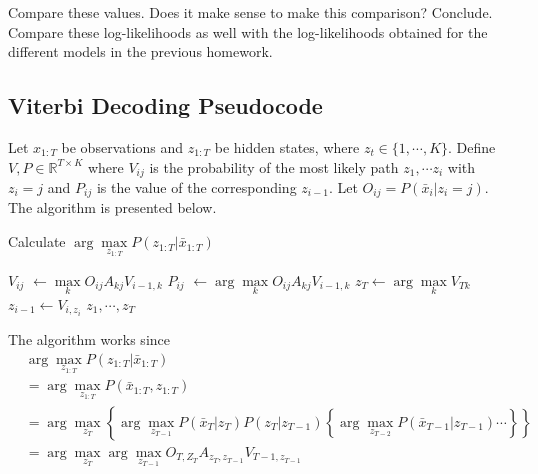 \documentclass[paper=a4, fontsize=11pt]{scrartcl} %
\numberwithin{equation}{section} %
\numberwithin{figure}{section} %
\numberwithin{table}{section} %
\begin{document}
Compare these values. Does it make sense to make this comparison? Conclude. Compare these log-likelihoods as well with
the log-likelihoods obtained for the different models in the previous homework.

\subsection{Viterbi Decoding Pseudocode}

Let $x_{1:T}$ be observations and $z_{1:T}$ be hidden states, where $z_t \in \{1,\cdots, K\}$. Define $V,P \in \mathbb{R}^{T \times K}$ where $V_{ij}$ is the probability of the most likely path $z_1, \cdots z_i$ with $z_i=j$ and $P_{ij}$ is the value of the corresponding $z_{i-1}$. Let $O_{ij}=P(\bar{x}_i|z_i=j)$. The algorithm is presented below.

\begin{algorithm} %
	\caption{Calculate $\arg\max\limits_{z_{1:T}}P(z_{1:T} | \bar{x}_{1:T})$} %
	\label{alg1} %
	\begin{algorithmic}[1] %
		 
		\EndFor
		\State $V_{ij}$ $\leftarrow \max\limits_{k} O_{ij}A_{kj}V_{i-1,k}$
		\State $P_{ij}$ $\leftarrow \arg\max\limits_{k}O_{ij}A_{kj} V_{i-1,k}$ 
		\EndFor
		\EndFor
		\State $ z_T \leftarrow \arg\max\limits_{k} V_{Tk}$
		\State $ z_{i-1} \leftarrow V_{i, z_{i}}$
		\EndFor
		\Return $z_1, \cdots, z_T$
	\end{algorithmic}
\end{algorithm}

The algorithm works since 
\begin{align}
&\arg\max\limits_{z_{1:T}}P(z_{1:T} | \bar{x}_{1:T}) \\ &=\arg\max\limits_{z_{1:T}}P(\bar{x}_{1:T},z_{1:T}) \\
&= \arg\max\limits_{z_{T}}\left\{\arg\max\limits_{z_{T-1}}P(\bar{x}_T|z_T)P(z_T|z_{T-1})\left\{\arg\max\limits_{z_{T-2}} P(\bar{x}_{T-1}|z_{T-1}) \cdots \right\}\right\}\\
&=\arg\max\limits_{z_T}\arg\max\limits_{z_{T-1}}O_{T,Z_{T}}A_{z_{T},z_{T-1}}V_{T-1,z_{T-1}}
\end{align}
\end{document}
